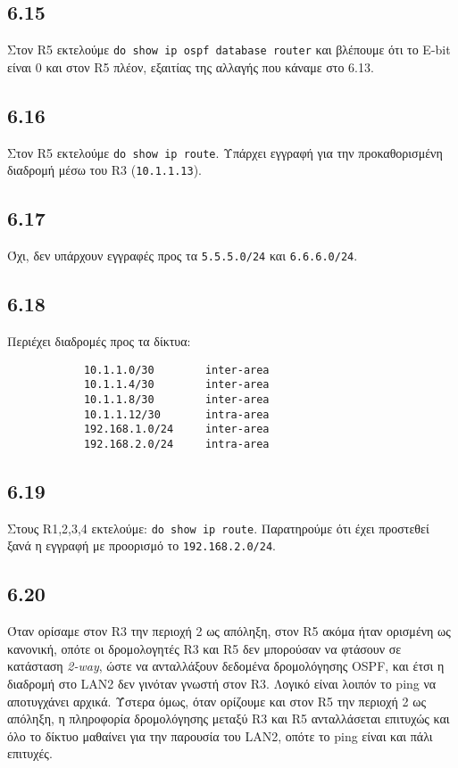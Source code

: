\documentclass[a4paper, 12pt]{article}
\begin{document}
	\subsection*{6.15}
		Στον R5 εκτελούμε \verb|do show ip ospf database router| και βλέπουμε ότι το E-bit είναι 0 και στον R5 πλέον, εξαιτίας της αλλαγής που κάναμε στο 6.13.

	\subsection*{6.16}
		Στον R5 εκτελούμε \verb|do show ip route|. Υπάρχει εγγραφή για την προκαθορισμένη διαδρομή μέσω του R3 (\verb|10.1.1.13|).

	\subsection*{6.17}
		Όχι, δεν υπάρχουν εγγραφές προς τα \verb|5.5.5.0/24| και \verb|6.6.6.0/24|.

	\subsection*{6.18} 
		Περιέχει διαδρομές προς τα δίκτυα:
		
		\begin{verbatim}
			10.1.1.0/30        inter-area
			10.1.1.4/30        inter-area
			10.1.1.8/30        inter-area
			10.1.1.12/30       intra-area
			192.168.1.0/24     inter-area
			192.168.2.0/24     intra-area
		\end{verbatim}

	\subsection*{6.19}
		Στους R1,2,3,4 εκτελούμε: \verb|do show ip route|. Παρατηρούμε ότι έχει προστεθεί ξανά η εγγραφή με προορισμό το \verb|192.168.2.0/24|.

	\subsection*{6.20}
		Όταν ορίσαμε στον R3 την περιοχή 2 ως απόληξη, στον R5 ακόμα ήταν ορισμένη ως κανονική, οπότε οι δρομολογητές R3 και R5 δεν μπορούσαν να φτάσουν σε κατάσταση \emph{2-way}, ώστε να ανταλλάξουν δεδομένα δρομολόγησης OSPF, και έτσι η διαδρομή στο LAN2 δεν γινόταν γνωστή στον R3. Λογικό είναι λοιπόν το ping να αποτυγχάνει αρχικά. Ύστερα όμως, όταν ορίζουμε και στον R5 την περιοχή 2 ως απόληξη, η πληροφορία δρομολόγησης μεταξύ R3 και R5 ανταλλάσεται επιτυχώς και όλο το δίκτυο μαθαίνει για την παρουσία του LAN2, οπότε το ping είναι και πάλι επιτυχές.
\end{document}
